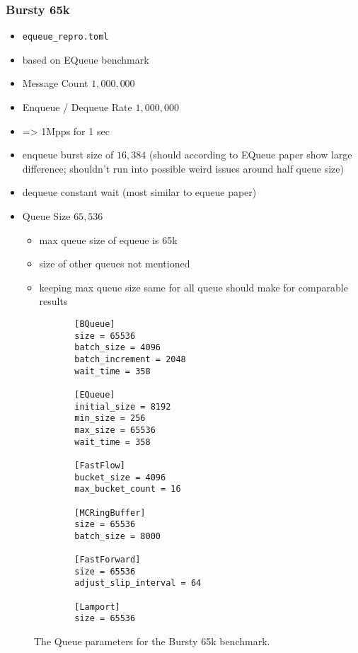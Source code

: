 \subsubsection{Bursty 65k}
\begin{itemize}
    \item \texttt{equeue\_repro.toml}
    \item based on EQueue benchmark
    \item Message Count $1,000,000$
    \item Enqueue / Dequeue Rate $1,000,000$ 
    \item => 1Mpps for 1 sec
    \item enqueue burst size of $16,384$ (should according to EQueue paper show large difference; shouldn't
        run into possible weird issues around half queue size)
    \item dequeue constant wait (most similar to equeue paper) 
    \item Queue Size $65,536$
        \begin{itemize}
            \item max queue size of equeue is 65k
            \item size of other queues not mentioned
            \item keeping max queue size same for all queue should make for comparable results
        \end{itemize}
\end{itemize}

\begin{figure}
    \centering
    \begin{verbatim}
        [BQueue]
        size = 65536
        batch_size = 4096
        batch_increment = 2048
        wait_time = 358

        [EQueue]
        initial_size = 8192
        min_size = 256
        max_size = 65536
        wait_time = 358

        [FastFlow]
        bucket_size = 4096
        max_bucket_count = 16

        [MCRingBuffer]
        size = 65536
        batch_size = 8000

        [FastForward]
        size = 65536
        adjust_slip_interval = 64

        [Lamport]
        size = 65536
    \end{verbatim}
    \caption{The Queue parameters for the Bursty 65k benchmark.}
    \label{fig:toml-bursty-65k}
\end{figure}

